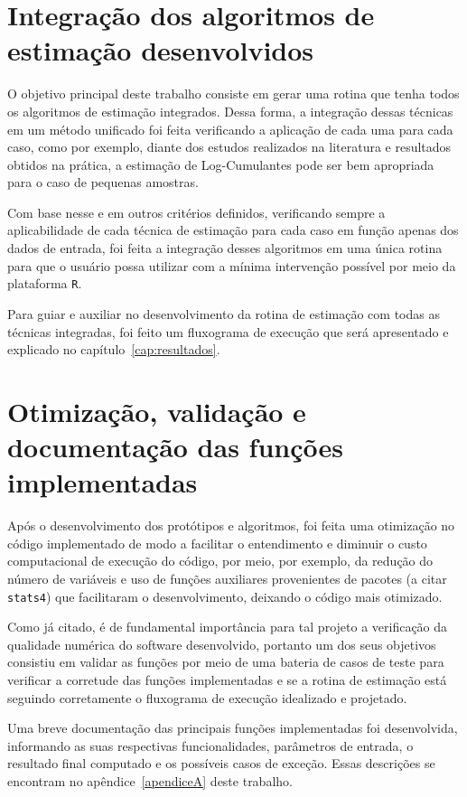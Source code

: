 \section{Integração dos algoritmos de estimação desenvolvidos}

O objetivo principal deste trabalho consiste em gerar uma rotina que tenha todos os algoritmos de estimação integrados. Dessa forma, a integração dessas técnicas em um método unificado foi feita verificando a aplicação de cada uma para cada caso, como por exemplo, diante dos estudos realizados na literatura e resultados obtidos na prática, a estimação de Log-Cumulantes pode ser bem apropriada para o caso de pequenas amostras.

Com base nesse e em outros critérios definidos, verificando sempre a aplicabilidade de cada técnica de estimação para cada caso em função apenas dos dados de entrada, foi feita a integração desses algoritmos em uma única rotina para que o usuário possa utilizar com a mínima intervenção possível por meio da plataforma \texttt{R}.

Para guiar e auxiliar no desenvolvimento da rotina de estimação com todas as técnicas integradas, foi feito um fluxograma de execução que será apresentado e explicado no capítulo~\ref{cap:resultados}.


\section{Otimização, validação e documentação das funções implementadas}

Após o desenvolvimento dos protótipos e algoritmos, foi feita uma otimização no código implementado de modo a facilitar o entendimento e diminuir o custo computacional de execução do código, por meio, por exemplo, da redução do número de variáveis e uso de funções auxiliares provenientes de pacotes (a citar \texttt{stats4}) que facilitaram o desenvolvimento, deixando o código mais otimizado.

Como já citado, é de fundamental importância para tal projeto a verificação da qualidade numérica do software desenvolvido, portanto um dos seus objetivos consistiu em validar as funções por meio de uma bateria de casos de teste para verificar a corretude das funções implementadas e se a rotina de estimação está seguindo corretamente o fluxograma de execução idealizado e projetado.

Uma breve documentação das principais funções implementadas foi desenvolvida, informando as suas respectivas funcionalidades, parâmetros de entrada, o resultado final computado e os possíveis casos de exceção. Essas descrições se encontram no apêndice~\ref{apendiceA} deste trabalho.
